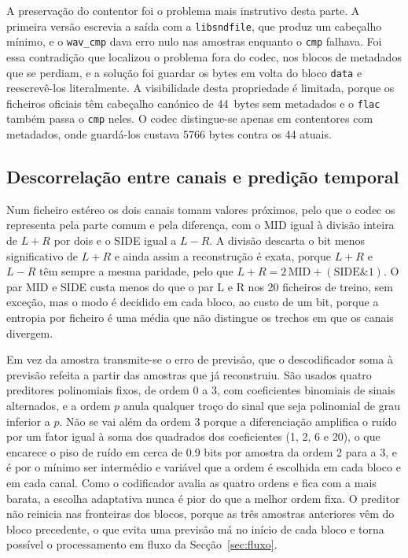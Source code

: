 \documentclass[a4paper,11pt]{article}
\newcommand{\prog}[1]{\texttt{#1}}
\begin{document}
A preservação do contentor foi o problema mais instrutivo desta parte. A
primeira versão escrevia a saída com a \texttt{libsndfile}, que produz um
cabeçalho mínimo, e o \prog{wav\_cmp} dava erro nulo nas amostras enquanto o
\prog{cmp} falhava. Foi essa contradição que localizou o problema fora do codec,
nos blocos de metadados que se perdiam, e a solução foi guardar os bytes em volta
do bloco \texttt{data} e reescrevê-los literalmente. A visibilidade desta
propriedade é limitada, porque os ficheiros oficiais têm cabeçalho canónico de
\num{44}~bytes sem metadados e o \prog{flac} também passa o \prog{cmp} neles. O
codec distingue-se apenas em contentores com metadados, onde guardá-los custava
\num{5766} bytes contra os \num{44} atuais.

\subsection{Descorrelação entre canais e predição temporal}
\label{sec:pred}
Num ficheiro estéreo os dois canais tomam valores próximos, pelo que o codec os
representa pela parte comum e pela diferença, com o MID igual à divisão inteira
de $L+R$ por dois e o SIDE igual a $L-R$. A divisão descarta o bit menos
significativo de $L+R$ e ainda assim a reconstrução é exata, porque $L+R$ e
$L-R$ têm sempre a mesma paridade, pelo que
$L+R = 2\,\mathrm{MID} + (\mathrm{SIDE} \mathbin{\&} 1)$. O par MID e SIDE custa
menos do que o par L e R nos 20 ficheiros de treino, sem exceção, mas o modo é
decidido em cada bloco, ao custo de um bit, porque a entropia por ficheiro é uma
média que não distingue os trechos em que os canais divergem.

Em vez da amostra transmite-se o erro de previsão, que o descodificador soma à
previsão refeita a partir das amostras que já reconstruiu. São usados quatro
preditores polinomiais fixos, de ordem 0 a 3, com coeficientes binomiais de
sinais alternados, e a ordem $p$ anula qualquer troço do sinal que seja
polinomial de grau inferior a $p$. Não se vai além da ordem 3 porque a
diferenciação amplifica o ruído por um fator igual à soma dos quadrados dos
coeficientes (\num{1}, \num{2}, \num{6} e \num{20}), o que encarece o piso de
ruído em cerca de \num{0,9} bits por amostra da ordem 2 para a 3, e é por o
mínimo ser intermédio e variável que a ordem é escolhida em cada bloco e em cada
canal. Como o codificador avalia as quatro ordens e fica com a mais barata, a
escolha adaptativa nunca é pior do que a melhor ordem fixa. O preditor não reinicia nas fronteiras dos blocos, porque as três
amostras anteriores vêm do bloco precedente, o que evita uma previsão má no
início de cada bloco e torna possível o processamento em fluxo da
Secção~\ref{sec:fluxo}.
\end{document}

